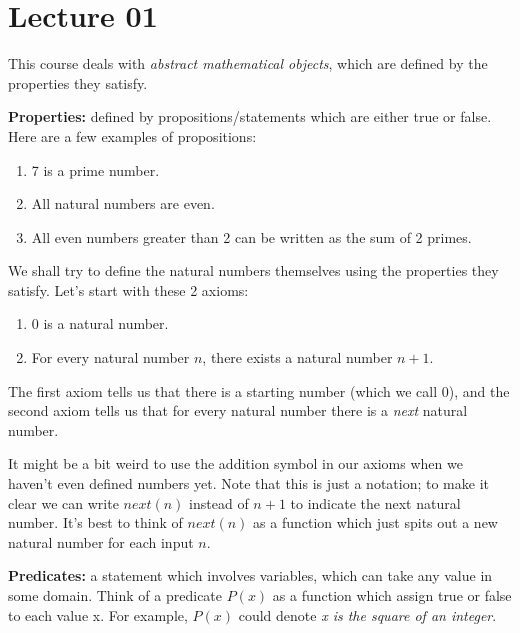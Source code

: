 \documentclass[a4paper,10pt]{article}
\theoremstyle{definition} %
\begin{document}
    \section{Lecture 01}
    This course deals with \emph{abstract mathematical objects}, which
    are defined by the properties they satisfy.

    \textbf{Properties:} defined by propositions/statements which are either true or false. 
    Here are a few examples of propositions:
    \begin{enumerate}
        \item 7 is a prime number.
        \item All natural numbers are even.
        \item All even numbers greater than 2 can be written as the sum of 2 primes.
    \end{enumerate}

    We shall try to define the natural numbers themselves using the properties 
    they satisfy. Let's start with these 2 axioms:

    \begin{tcolorbox}[colback=blue!10!white, colframe=blue!50!black]
    \begin{enumerate}
        \item $0$ is a natural number. \footnotemark
        \item For every natural number $n$, there exists a natural number $n+1$.
    \end{enumerate}
    \end{tcolorbox}

    The first axiom tells us that there is a starting number (which we call 0), 
    and the second axiom tells us that for every natural number there is a \emph{next} 
    natural number.

    It might be a bit weird to use the addition symbol in our axioms when we haven't 
    even defined numbers yet. Note that this is just a notation; to make it clear
    we can write $next(n)$ instead of $n+1$ to indicate the next natural number. 
    It's best to think of $next(n)$ as a function which just spits out a new natural
    number for each input $n$.

    \textbf{Predicates: }a statement which involves variables, which can take any value
    in some domain. Think of a predicate $P(x)$ as a function which assign true or 
    false to each value x. For example, $P(x)$ could denote \emph{x is the square of
    an integer}.
\end{document}
